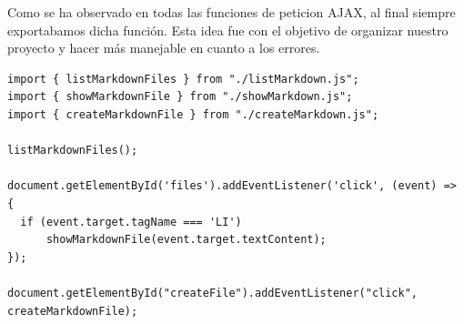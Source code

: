 Como se ha observado en todas las funciones de peticion AJAX, al final siempre exportabamos dicha función. Esta idea fue con el objetivo de organizar nuestro proyecto y hacer más manejable en cuanto a los errores.

\begin{verbatim}
import { listMarkdownFiles } from "./listMarkdown.js";
import { showMarkdownFile } from "./showMarkdown.js";
import { createMarkdownFile } from "./createMarkdown.js";

listMarkdownFiles();

document.getElementById('files').addEventListener('click', (event) => {
  if (event.target.tagName === 'LI')
      showMarkdownFile(event.target.textContent);
});

document.getElementById("createFile").addEventListener("click", createMarkdownFile);
\end{verbatim}


